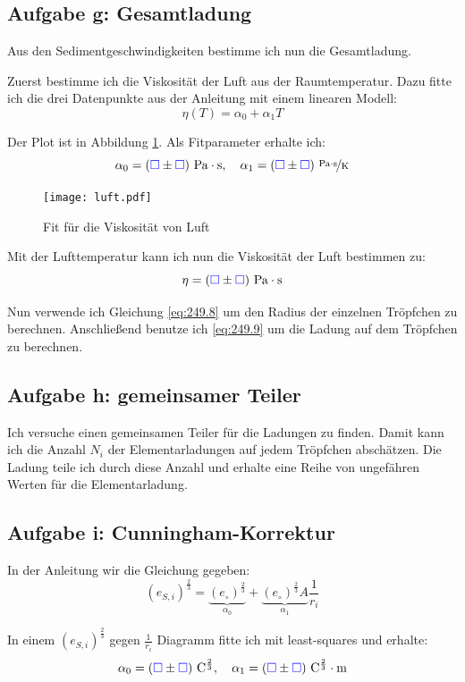 \documentclass[11pt]{article}
\newcommand{\emesswert}{\left(\messwert \pm \messwert \right)}
\newcommand{\messwert}{\textcolor{blue}{\square}}
\begin{document}
\subsection{Aufgabe g: Gesamtladung}

Aus den Sedimentgeschwindigkeiten bestimme ich nun die Gesamtladung.

Zuerst bestimme ich die Viskosität der Luft aus der Raumtemperatur. Dazu fitte
ich die drei Datenpunkte aus der Anleitung mit einem linearen Modell:
\[ \eta(T) = \alpha_0 + \alpha_1 T \]

Der Plot ist in Abbildung \ref{fig:luft.pdf}. Als Fitparameter erhalte ich:
\[
	\alpha_0 = \unit[\emesswert]{Pa \cdot s}
	, \quad
	\alpha_1 = \unitfrac[\emesswert]{Pa \cdot s}K
\]

\begin{figure}[h!]
	\centering
	\texttt{[image: luft.pdf]}
	\caption{Fit für die Viskosität von Luft}
	\label{fig:luft.pdf}
\end{figure}

Mit der Lufttemperatur kann ich nun die Viskosität der Luft bestimmen zu:
\[ \eta = \unit[\emesswert]{Pa \cdot s} \]

Nun verwende ich Gleichung \eqref{eq:249.8} um den Radius der einzelnen
Tröpfchen zu berechnen. Anschließend benutze ich \eqref{eq:249.9} um die Ladung
auf dem Tröpfchen zu berechnen.

\subsection{Aufgabe h: gemeinsamer Teiler}

Ich versuche einen gemeinsamen Teiler für die Ladungen zu finden. Damit kann
ich die Anzahl $N_i$ der Elementarladungen auf jedem Tröpfchen abschätzen. Die
Ladung teile ich durch diese Anzahl und erhalte eine Reihe von ungefähren
Werten für die Elementarladung.

\subsection{Aufgabe i: Cunningham-Korrektur}

In der Anleitung wir die Gleichung gegeben:
\[
	\left( e_{S, i} \right)^{\frac 23}
	= \underbrace{\left( e_\circ \right)^{\frac 23}}_{\alpha_0}
	+ \underbrace{\left( e_\circ \right)^{\frac 23} A}_{\alpha_1} \frac 1{r_i}
\]

In einem $\left( e_{S, i} \right)^{\frac 23}$ gegen $\frac 1{r_i}$ Diagramm
fitte ich mit least-squares und erhalte:
\[
	\alpha_0 = \unit[\emesswert]{C^{\frac 23}}
	, \quad
	\alpha_1 = \unit[\emesswert]{C^{\frac 23} \cdot m}
\]
\end{document}
